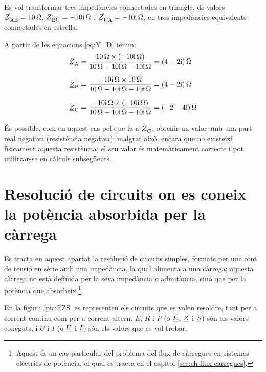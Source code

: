 	
\begin{exemple}\label{ex:TriangleEstrella}
	\addcontentsxms{\TriangleEstrella}
    Es vol transformar tres impedàncies connectades en triangle, de
    valors $ \underline{Z}_\mathrm{AB}=\qty{10}{\ohm}$,
    $\cmplx{Z}\ped{BC}=\complexqty{-j10}{\ohm}$ i
    $\cmplx{Z}\ped{CA}=\complexqty{-j10}{\ohm}$, en tres impedàncies
    equivalents connectades en estrella.

    A partir de les equacions \eqref{eq:Y_D}  tenim:
    \begin{align*}
       \cmplx{Z}\ped{A} & = \frac{\qty{10}{\ohm}\times(\complexqty{-j10}{\ohm})}{\qty{10}{\ohm} - \complexqty{j10}{\ohm} - \complexqty{j10}{\ohm}} = \complexqty{4-j2}{\ohm} \\[1.5ex]
       \cmplx{Z}\ped{B} & = \frac{\complexqty{-j10}{\ohm}\times \qty{10}{\ohm}}{\qty{10}{\ohm} - \complexqty{j10}{\ohm} - \complexqty{j10}{\ohm}} = \complexqty{4-j2}{\ohm} \\[1.5ex]
    \cmplx{Z}\ped{C} &= \frac{\complexqty{-j10}{\ohm}\times(\complexqty{-j10}{\ohm})}{\qty{10}{\ohm} -
    \complexqty{j10}{\ohm} - \complexqty{j10}{\ohm}} = \complexqty{-2-j4}{\ohm}
    \end{align*}

    És possible, com en aquest cas pel que fa a $\underline{Z}_\mathrm{C}$,
    obtenir un valor amb una part real negativa (resistència negativa);
    malgrat això, encara que no existeixi físicament aquesta resistència,
    el seu valor és matemàticament correcte i  pot utilitzar-se en
    càlculs subsegüents.
\end{exemple}



\section{Resolució de circuits on es coneix la potència absorbida per la
càrrega}\label{sec:EZS}

Es tracta en aquest apartat la resolució de circuits simples,
formats per una font de tensió en sèrie amb una impedància, la qual
alimenta a una càrrega; aquesta càrrega no està definida per la seva
impedància o admitància, sinó que per la potència que absorbeix.\footnote{Aquest és un cas particular del problema del flux de càrregues en sistemes elèctrics de potència, el qual es tracta en el capítol \ref{sec:ch-flux-carregues}.}

En la figura \vref{pic:EZS} es representen els circuits que es volen
resoldre, tant per a corrent continu com per a corrent altern. $E$,
$R$ i $P$ (o $\underline{E}$, $\underline{Z}$ i $\underline{S}$) són els valors
coneguts, i $U$ i $I$ (o $\underline{U}$ i $\underline{I}$) són els valors
que es vol trobar.

